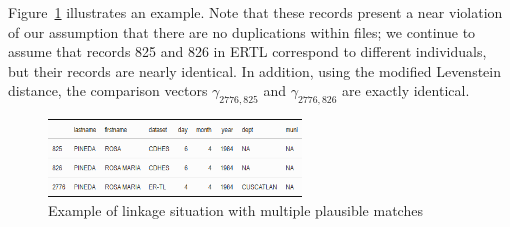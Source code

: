 \documentclass[12pt,letterpaper]{article}
\newcommand{\1}[1]{\mathbb{I}\!\left[#1\right]} %
\begin{document}
%	
%		
%	

%
%
%


%
%	
%		
%	



Figure~\ref{fig:rosa-maria} illustrates an example. Note that these
records present a near violation of our assumption that there are no
duplications within files; we continue to assume that records 825 and
826 in ERTL correspond to different individuals, but their records are
nearly identical. In addition, using the modified Levenstein distance, the comparison vectors \(\gamma_{2776, 825}\) and
\(\gamma_{2776, 826}\) are exactly identical.

\begin{figure}[htbp]
\begin{center}
\includegraphics[width=0.6\textwidth]{../notes/figures/el_salvador/rosa_records} 
\caption{Example of linkage situation with multiple plausible matches}\label{fig:rosa-maria}
\end{center}
\end{figure}
\end{document}
